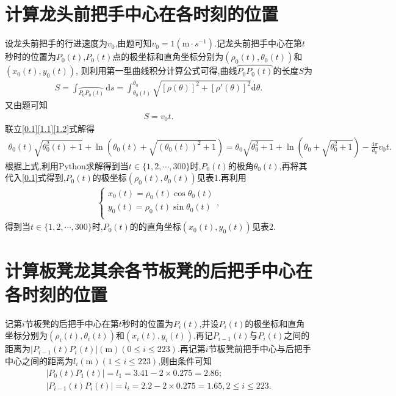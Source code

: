 \documentclass[lang=cn,newtx,10pt,scheme=chinese]{../Template/elegantbook}
\begin{document}
\section{计算龙头前把手中心在各时刻的位置}\label{1.(2)}

设龙头前把手的行进速度为\(v_0\),由题可知\(v_0 = 1(\mathrm{m}\cdot s^{-1})\).记龙头前把手中心在第\(t\)秒时的位置为\(P_0(t)\),\(P_0(t)\)点的极坐标和直角坐标分别为\((\rho _0(t),\theta _0(t))\)和\((x_0(t),y_0(t))\),
则利用第一型曲线积分计算公式可得,曲线\(\wideparen{P_0P_0(t)}\)的长度\(S\)为
\begin{align}
S=\int_{\wideparen{P_0P_0(t)}}{\mathrm{d}s}=\int_{\theta _0(t)}^{\theta _0}{\sqrt{[\rho (\theta )]^2+[\rho ' (\theta )]^2}\mathrm{d}\theta}.\label{1.1}
\end{align}
又由题可知
\begin{align}
S = v_0t.\label{1.2}
\end{align}
联立\eqref{0.1}\eqref{1.1}\eqref{1.2}式解得
\begin{align}
\theta _0(t)\sqrt{\theta _{0}^{2}(t)+1}+\ln (\theta _0(t)+\sqrt{(\theta _0(t))^2+1}) =\theta _0\sqrt{\theta _{0}^{2}+1}+\ln (\theta _0+\sqrt{\theta _{0}^{2}+1}) -\frac{4\pi}{d_0}v_0t .
\end{align}
根据上式,利用Python求解得到当\(t\in \{ 1,2,\cdots ,300 \}\)时,\(P_0(t)\)的极角\(\theta _0(t)\),再将其代入\eqref{0.1}式得到,\(P_0(t)\)的极坐标\((\rho _0(t),\theta _0(t))\)见表1.再利用
\begin{align}
\begin{cases}
x_0(t)=\rho _0(t)\cos \theta _0(t)\\
y_0(t)=\rho _0(t)\sin \theta _0(t)\\
\end{cases},
\end{align}
得到当\(t\in \{ 1,2,\cdots ,300 \}\)时,\(P_0(t)\)的的直角坐标\((x_0(t),y_0(t))\)见表2.

\section{计算板凳龙其余各节板凳的后把手中心在各时刻的位置}

记第\(i\)节板凳的后把手中心在第\(t\)秒时的位置为\(P_{i}(t)\),并设\(P_{i}(t)\)的极坐标和直角坐标分别为\((\rho _{i}(t),\theta _{i}(t))\)和\((x_{i}(t),y_{i}(t))\),再记\(P_{i-1}(t)\)与\(P_{i}(t)\)之间的距离为\(| P_{i-1}(t)P_{i}(t)|(\mathrm{m}) (0\leqslant i\leqslant 223)\).再记第$i$节板凳前把手中心与后把手中心之间的距离为\(l_i(\mathrm{m})(1\leq i\leq 223)\),则由条件可知
\begin{gather}
| P_0(t)P_1(t)| = l_1 = 3.41 - 2\times 0.275 = 2.86;
\\
| P_{i-1}(t)P_{i}(t)| = l_i = 2.2 - 2\times 0.275 = 1.65,2\leqslant i\leqslant 223.
\end{gather}
\end{document}
